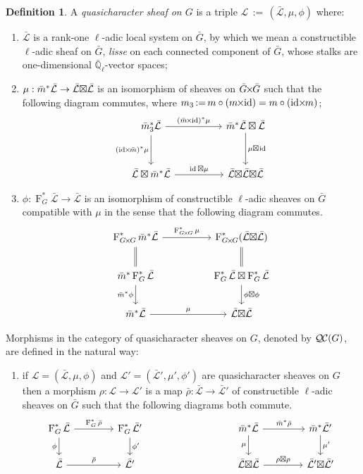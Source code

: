 \documentclass[CM,Submssn,SecEq]{degruyter-crelle} %
\makeatletter
\theoremstyle{plain}
\theoremstyle{definition}
\newtheorem{definition}[theorem]{Definition}
\theoremstyle{remark}
\newcommand{\EE}{\mathbb{\bar Q}_\ell}
\newcommand{\Frob}[1]{\operatorname{F}_{#1}}
\DeclareMathOperator{\id}{id}
\newcommand{\ceq}{{\, :=\, }}
\newcommand{\qcs}[1]{{\mathcal{#1}}}
\newcommand{\gqcs}[1]{{\mathcal{\bar #1}}}
\newcommand{\QC}{{\mathcal{Q\hskip-0.8pt C}}}
\newcommand{\labitem}[2]{
\def\@itemlabel{\textbf{#1}}
\item
\def\@currentlabel{#1}\label{#2}}
\newcommand{\bm}{\bar{m}}
\newcommand{\bG}{\bar{G}}
\newcommand{\brho}{{\bar\rho}}
\newcommand{\tight}[3]{\hspace{-#1pt}{#2}\hspace{-#3pt}}
\newcommand{\bGxG}{\text{$\bar{G} \tight{1}{\times}{1} \bar{G}$}}
\newcommand{\GxxG}{\text{$G \tight{1}{\times}{1} G$}}
\newcommand{\LxL}{\text{$\gqcs{L} \tight{0}{\boxtimes}{0} \gqcs{L}$}}
\makeatother
\begin{document}
\begin{definition}\label{def:QC}
A \emph{quasicharacter sheaf on $G$} is a triple
$\qcs{L}\ceq (\gqcs{L},\mu,\phi)$ where:
\begin{enumerate}
\labitem{(QC.1)}{QC.1} $\gqcs{L}$ is a rank-one $\ell$-adic local system on $\bG$, by which we mean a constructible $\ell$-adic sheaf on $\bG$, {\it lisse} on each connected component of $\bG$, whose stalks are one-dimensional $\EE$-vector spaces;
\labitem{(QC.2)}{QC.2} $\mu: \bm^* \gqcs{L} \to \LxL$ is an isomorphism of
sheaves on $\bGxG$ such that the following diagram commutes,
  where $m_3 \ceq m\circ (m\tight{1}{\times}{2}\id) = m\circ (\id\tight{2}{\times}{1} m)$;
  \[
  \begin{tikzcd}[row sep=30]
  \bm_3^*\gqcs{L} \arrow{rr}{(\bm \tight{1}{\times}{2} \id)^*\mu} \arrow[swap]{d}{(\id \tight{2}{\times}{1} \bm)^*\mu}
    &&  \bm^*\gqcs{L} \boxtimes \gqcs{L} \dar{\mu \tight{0}{\boxtimes}{1} \id} \\
    \gqcs{L} \boxtimes \bm^* \gqcs{L} \arrow{rr}{\id \boxtimes \mu}
    &&  \gqcs{L} \tight{0}{\boxtimes}{0} \LxL
  \end{tikzcd}
  \]
\labitem{(QC.3)}{QC.3} $\phi : \Frob{G}^* \gqcs{L} \to \gqcs{L}$ is an
  isomorphism of constructible $\ell$-adic sheaves on $\bG$ compatible with
  $\mu$ in the sense that the following diagram commutes.
  \[
  \begin{tikzcd}[row sep=20]
  \Frob{\GxxG}^* \bm^* \gqcs{L} \arrow{rr}{\Frob{\GxxG}^*\mu}
    && \Frob{\GxxG}^*(\LxL)\\
    \arrow[equal]{u} \bm^*  \Frob{G}^* \gqcs{L} \arrow[swap]{d}{\bm^* \phi}
    && \Frob{G}^*\gqcs{L}\boxtimes \Frob{G}^*\gqcs{L} \dar{\phi\boxtimes \phi} \arrow[equal]{u} \\
    \bm^*\gqcs{L} \arrow{rr}{\mu}
    && \LxL
  \end{tikzcd}
  \]
\end{enumerate}
\end{definition}

Morphisms in the category of quasicharacter sheaves on $G$, denoted by $\QC(G)$, are defined in the natural way:
\begin{enumerate}
\labitem{(QC.4)}{QC.4} if $\qcs{L} = (\gqcs{L},\mu,\phi)$ and
  $\qcs{L'} = (\gqcs{L'},\mu',\phi')$ are quasicharacter sheaves on $G$ then
  a morphism $\rho : \qcs{L} \to \qcs{L}'$ is a map $\brho : \gqcs{L} \to \gqcs{L'}$
  of constructible $\ell$-adic sheaves on $\bG$ such that the following diagrams both commute.
  \[
  \begin{tikzcd}[column sep=40]
  \Frob{G}^* \gqcs{L} \rar{\Frob{G}^* \brho} \arrow[swap]{d}{\phi} & \Frob{G}^* \gqcs{L'} \dar{\phi'}
  & & \arrow[swap]{d}{\mu} \bm^* \gqcs{L} \rar{\bm^* \brho} & \bm^* \gqcs{L'} \dar{\mu'} \\
  \gqcs{L} \rar{\brho} & \gqcs{L'}
  & {} & \LxL \rar{\tight{1}{\rho\boxtimes \rho}{1}} & \gqcs{L'} \tight{0}{\boxtimes}{0} \gqcs{L'}
  \end{tikzcd}
  \]
\end{enumerate}
\end{document}
